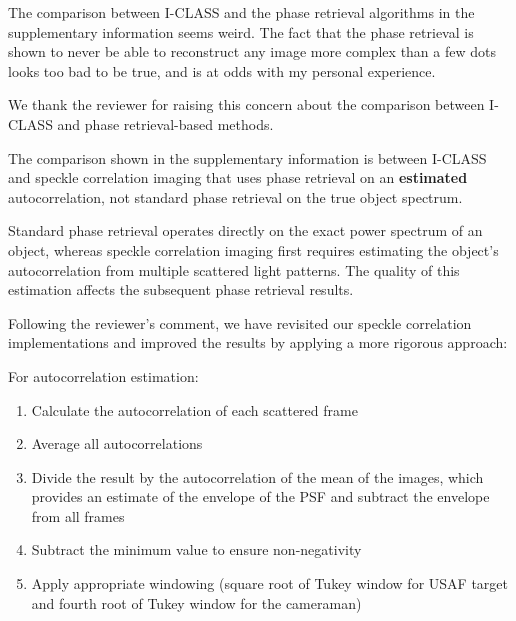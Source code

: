 \documentclass[12pt]{article}
\newenvironment{solved_reviewercomment}
    {\begin{tcolorbox}[width=\linewidth,colback=gray!5,colframe=solved_commentcolor!50,title=Reviewer Comment,left=5pt,right=5pt]}
    {\end{tcolorbox}}
\newenvironment{ourresponse}
    {\begin{tcolorbox}[width=\linewidth,breakable,enhanced,colback=gray!5,colframe=responsecolor!50,title=Response,left=5pt,right=5pt]}
    {\end{tcolorbox}}
\begin{document}
    \leavevmode\vspace{-\baselineskip}
        \begin{solved_reviewercomment}
            The comparison between I-CLASS and the phase retrieval algorithms in the supplementary information seems weird. The fact that the phase retrieval is shown to never be able to reconstruct any image more complex than a few dots looks too bad to be true, and is at odds with my personal experience.
        \end{solved_reviewercomment}

        \begin{ourresponse}
            We thank the reviewer for raising this concern about the comparison between I-CLASS and phase retrieval-based methods.
            
            The comparison shown in the supplementary information is between I-CLASS and speckle correlation imaging that uses phase retrieval on an \textbf{estimated} autocorrelation, not standard phase retrieval on the true object spectrum.
            
            Standard phase retrieval operates directly on the exact power spectrum of an object, whereas speckle correlation imaging first requires estimating the object's autocorrelation from multiple scattered light patterns. The quality of this estimation affects the subsequent phase retrieval results.
            
            Following the reviewer's comment, we have revisited our speckle correlation implementations and improved the results by applying a more rigorous approach:
            
            For autocorrelation estimation:
            \begin{enumerate}
                \item Calculate the autocorrelation of each scattered frame
                \item Average all autocorrelations
                \item Divide the result by the autocorrelation of the mean of the images, which provides an estimate of the envelope of the PSF and subtract the envelope from all frames
                \item Subtract the minimum value to ensure non-negativity
                \item Apply appropriate windowing (square root of Tukey window for USAF target and fourth root of Tukey window for the cameraman)
            \end{enumerate}
            

\end{ourresponse}
\end{document}
